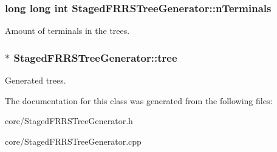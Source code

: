 \subsubsection[{\texorpdfstring{n\+Terminals}{nTerminals}}]{\setlength{\rightskip}{0pt plus 5cm}long long int Staged\+F\+R\+R\+S\+Tree\+Generator\+::n\+Terminals\hspace{0.3cm}{\ttfamily [private]}}\hypertarget{class_staged_f_r_r_s_tree_generator_a9ac1eafca6caa14601df23da77cfa565}{}\label{class_staged_f_r_r_s_tree_generator_a9ac1eafca6caa14601df23da77cfa565}
Amount of terminals in the trees. 
\subsubsection[{\texorpdfstring{tree}{tree}}]{$\ast$ Staged\+F\+R\+R\+S\+Tree\+Generator\+::tree\hspace{0.3cm}{\ttfamily [private]}}\hypertarget{class_staged_f_r_r_s_tree_generator_a584a1e0e109ac6bdeae996178f8d8646}{}\label{class_staged_f_r_r_s_tree_generator_a584a1e0e109ac6bdeae996178f8d8646}
Generated trees. 

The documentation for this class was generated from the following files\+:\begin{DoxyCompactItemize}
\item 
core/Staged\+F\+R\+R\+S\+Tree\+Generator.\+h\item 
core/Staged\+F\+R\+R\+S\+Tree\+Generator.\+cpp\end{DoxyCompactItemize}
